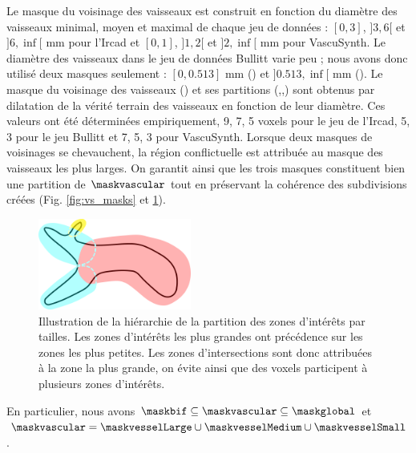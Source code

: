 Le masque du voisinage des vaisseaux est construit en fonction du diamètre des vaisseaux minimal, moyen et maximal de chaque jeu de données : $[0,3]$, $]3,6[$ et $]6,\inf[$ mm pour l'Ircad et $[0,1]$, $]1,2[$ et $]2,\inf[$ mm pour VascuSynth. Le diamètre des vaisseaux dans le jeu de données Bullitt varie peu ; nous avons donc utilisé deux masques seulement : $[0,0.513]$ mm (\maskvesselSmall) et $]0.513,\inf[$ mm (\maskvesselMedium). Le masque du voisinage des vaisseaux (\maskvessel) et ses partitions (\maskvesselLarge,\maskvesselMedium,\maskvesselSmall) sont obtenus par dilatation de la vérité terrain des vaisseaux en fonction de leur diamètre. Ces valeurs ont été déterminées empiriquement, 9, 7, 5 voxels pour le jeu de l'Ircad, 5, 3 pour le jeu Bullitt et 7, 5, 3 pour VascuSynth. Lorsque deux masques de voisinages se chevauchent, la région conflictuelle est attribuée au masque des vaisseaux les plus larges. On garantit ainsi que les trois masques constituent bien une partition de $\maskvascular$ tout en préservant la cohérence des subdivisions créées (Fig. \ref{fig:vs_masks} et \ref{fig:numibranch}).

\begin{figure}[!ht]
  \centering
  \includegraphics[height=3cm]{Images/numibranch.png}
  \caption{Illustration de la hiérarchie de la partition des zones d'intérêts par tailles. Les zones d'intérêts les plus grandes ont précédence sur les zones les plus petites. Les zones d'intersections sont donc attribuées à la zone la plus grande, on évite ainsi que des voxels participent à plusieurs zones d'intérêts.}
  \label{fig:numibranch}
\end{figure}


En particulier, nous avons $\maskbif \subseteq \maskvascular \subseteq \maskglobal$ et $\maskvascular = \maskvesselLarge \cup \maskvesselMedium \cup \maskvesselSmall$.

